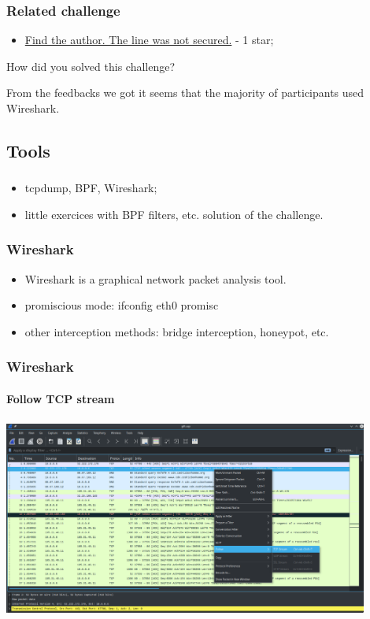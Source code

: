 \documentclass[]{beamer}
\begin{document}
\begin{frame}
\frametitle{Related challenge}
\begin{itemize}
    \item \href{https://github.com/cscluxembourg/vestatech/blob/master/challenges/find-the-author/gift.cap}{Find the author. The line was not secured.} - 1 star;
\end{itemize}
\bigskip
How did you solved this challenge?

\bigskip
From the feedbacks we got it seems that the majority of participants used Wireshark.
\end{frame}




\subsection{Tools}
\begin{frame}
\frametitle{}
\begin{itemize}
\item tcpdump, BPF, Wireshark;
\item little exercices with BPF filters, etc. solution of the challenge.
\end{itemize}
\end{frame}

\begin{frame}
\frametitle{Wireshark}
\begin{itemize}
    \item Wireshark is a graphical network packet analysis tool.
    \item promiscious mode: ifconfig eth0 promisc
    \item other interception methods: bridge interception, honeypot, etc.
\end{itemize}
\end{frame}

\begin{frame}
\frametitle{Wireshark}
\framesubtitle{Follow TCP stream}
\begin{center}
    \includegraphics[height=6.5cm, width=12.0cm]{./images/Wireshark_follow_tcp_stream.png}
\end{center}
\end{frame}
\end{document}
